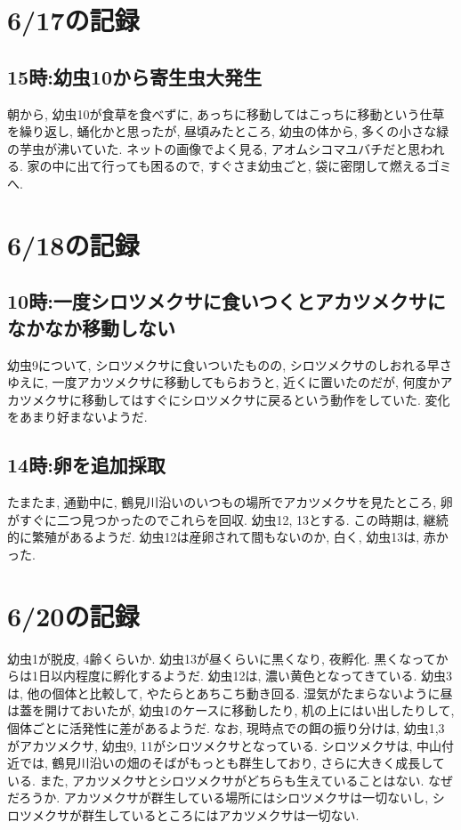 \documentclass{jsarticle}
\begin{document}
\section{6/17の記録}
\subsection{15時:幼虫10から寄生虫大発生}
朝から, 幼虫10が食草を食べずに, あっちに移動してはこっちに移動という仕草を繰り返し, 蛹化かと思ったが, 昼頃みたところ, 
幼虫の体から, 多くの小さな緑の芋虫が沸いていた. ネットの画像でよく見る, アオムシコマユバチだと思われる. 
家の中に出て行っても困るので, すぐさま幼虫ごと, 袋に密閉して燃えるゴミへ. 

\section{6/18の記録}
\subsection{10時:一度シロツメクサに食いつくとアカツメクサになかなか移動しない}
幼虫9について, シロツメクサに食いついたものの, シロツメクサのしおれる早さゆえに, 一度アカツメクサに移動してもらおうと, 近くに置いたのだが, 
何度かアカツメクサに移動してはすぐにシロツメクサに戻るという動作をしていた. 変化をあまり好まないようだ. 

\subsection{14時:卵を追加採取}
たまたま, 通勤中に, 鶴見川沿いのいつもの場所でアカツメクサを見たところ, 卵がすぐに二つ見つかったのでこれらを回収. 幼虫12, 13とする. 
この時期は, 継続的に繁殖があるようだ. 
幼虫12は産卵されて間もないのか, 白く, 幼虫13は, 赤かった. 

\section{6/20の記録}
幼虫1が脱皮, 4齢くらいか. 
幼虫13が昼くらいに黒くなり, 夜孵化. 黒くなってからは1日以内程度に孵化するようだ. 
幼虫12は, 濃い黄色となってきている. 
幼虫3は, 他の個体と比較して, やたらとあちこち動き回る. 湿気がたまらないように昼は蓋を開けておいたが, 幼虫1のケースに移動したり, 
机の上にはい出したりして, 個体ごとに活発性に差があるようだ. 
なお, 現時点での餌の振り分けは, 幼虫1,3がアカツメクサ, 幼虫9, 11がシロツメクサとなっている. 
シロツメクサは, 中山付近では, 鶴見川沿いの畑のそばがもっとも群生しており, さらに大きく成長している. 
また, アカツメクサとシロツメクサがどちらも生えていることはない. なぜだろうか. 
アカツメクサが群生している場所にはシロツメクサは一切ないし, シロツメクサが群生しているところにはアカツメクサは一切ない. 
\end{document}
